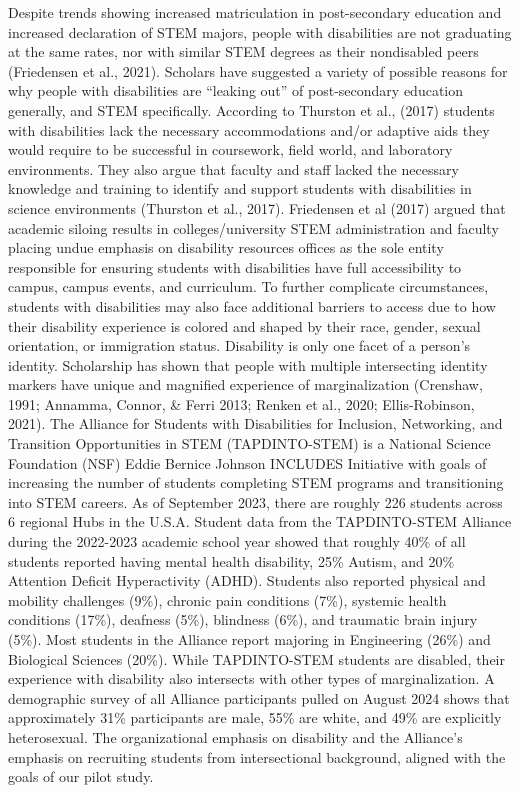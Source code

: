 \documentclass{sig-alternate} %
\begin{document}
\begin{large}
Despite trends showing increased matriculation in post-secondary education and increased declaration of STEM majors, people with disabilities are not graduating at the same rates, nor with similar STEM degrees as their nondisabled peers (Friedensen et al., 2021). Scholars have suggested a variety of possible reasons for why people with disabilities are “leaking out” of post-secondary education generally, and STEM specifically. According to Thurston et al., (2017) students with disabilities lack the necessary accommodations and/or adaptive aids they would require to be successful in coursework, field world, and laboratory environments. They also argue that faculty and staff lacked the necessary knowledge and training to identify and support students with disabilities in science environments (Thurston et al., 2017). Friedensen et al (2017) argued that academic siloing results in colleges/university STEM administration and faculty placing undue emphasis on disability resources offices as the sole entity responsible for ensuring students with disabilities have full accessibility to campus, campus events, and curriculum. To further complicate circumstances, students with disabilities may also face additional barriers to access due to how their disability experience is colored and shaped by their race, gender, sexual orientation, or immigration status. Disability is only one facet of a person’s identity. Scholarship has shown that people with multiple intersecting identity markers have unique and magnified experience of marginalization (Crenshaw, 1991; Annamma, Connor, \& Ferri 2013; Renken et al., 2020; Ellis-Robinson, 2021). The Alliance for Students with Disabilities for Inclusion, Networking, and Transition Opportunities in STEM (TAPDINTO-STEM) is a National Science Foundation (NSF) Eddie Bernice Johnson INCLUDES Initiative with goals of increasing the number of students completing STEM programs and transitioning into STEM careers. As of September 2023, there are roughly 226 students across 6 regional Hubs in the U.S.A. Student data from the TAPDINTO-STEM Alliance during the 2022-2023 academic school year showed that roughly 40\% of all students reported having mental health disability, 25\% Autism, and 20\% Attention Deficit Hyperactivity (ADHD). Students also reported physical and mobility challenges (9\%), chronic pain conditions (7\%), systemic health conditions (17\%), deafness (5\%), blindness (6\%), and traumatic brain injury (5\%). Most students in the Alliance report majoring in Engineering (26\%) and Biological Sciences (20\%). While TAPDINTO-STEM students are disabled, their experience with disability also intersects with other types of marginalization. A demographic survey of all Alliance participants pulled on August 2024 shows that approximately 31\% participants are male, 55\% are white, and 49\% are explicitly heterosexual. The organizational emphasis on disability and the Alliance’s emphasis on recruiting students from intersectional background, aligned with the goals of our pilot study.


\end{large}
\end{document}
